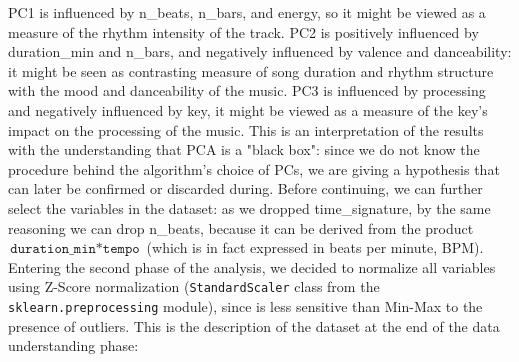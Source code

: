 \noindent PC1 is influenced by n\_beats, n\_bars, and energy, so it might be viewed as a measure of the rhythm intensity of the track. PC2 is positively influenced by duration\_min and n\_bars, and negatively influenced by valence and danceability: it might be seen as contrasting measure of song duration and rhythm structure with the mood and danceability of the music. PC3 is influenced by processing and negatively influenced by key, it might be viewed as a measure of the key’s impact on the processing of the music. This is an interpretation of the results with the understanding that PCA is a "black box": since we do not know the procedure behind the algorithm's choice of PCs, we are giving a hypothesis that can later be confirmed or discarded during. Before continuing, we can further select the variables in the dataset: as we dropped time\_signature, by the same reasoning we can drop n\_beats, because it can be derived from the product $\texttt{duration\_min}*\texttt{tempo}$ (which is in fact expressed in beats per minute, BPM). Entering the second phase of the analysis, we decided to normalize all variables using Z-Score normalization (\texttt{StandardScaler} class from the \texttt{sklearn.preprocessing} module), since is less sensitive than Min-Max to the presence of outliers. This is the description of the dataset at the end of the data understanding phase:\\

